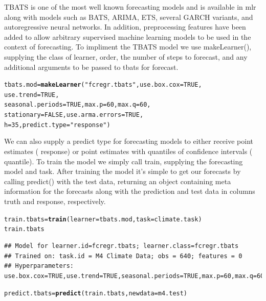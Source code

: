 \documentclass{article}\usepackage[]{graphicx}\usepackage[]{color}
\makeatletter
\newcommand{\hlnum}[1]{\textcolor[rgb]{0.686,0.059,0.569}{#1}}%
\newcommand{\hlstr}[1]{\textcolor[rgb]{0.192,0.494,0.8}{#1}}%
\newcommand{\hlstd}[1]{\textcolor[rgb]{0.345,0.345,0.345}{#1}}%
\newcommand{\hlkwb}[1]{\textcolor[rgb]{0.69,0.353,0.396}{#1}}%
\newcommand{\hlkwc}[1]{\textcolor[rgb]{0.333,0.667,0.333}{#1}}%
\newcommand{\hlkwd}[1]{\textcolor[rgb]{0.737,0.353,0.396}{\textbf{#1}}}%
\newenvironment{kframe}{%
 \def\at@end@of@kframe{}%
 \ifinner\ifhmode%
  \def\at@end@of@kframe{\end{minipage}}%
  \begin{minipage}{\columnwidth}%
 \fi\fi%
 \def\FrameCommand##1{\hskip\@totalleftmargin \hskip-\fboxsep
 \colorbox{shadecolor}{##1}\hskip-\fboxsep
     \hskip-\linewidth \hskip-\@totalleftmargin \hskip\columnwidth}%
 \MakeFramed {\advance\hsize-\width
   \@totalleftmargin\z@ \linewidth\hsize
   \@setminipage}}%
 {\par\unskip\endMakeFramed%
 \at@end@of@kframe}
\newenvironment{knitrout}{}{} %
\theoremstyle{definition}
\newcommand\code{\@codex}
\def\@codex#1{{\normalfont\ttfamily\hyphenchar\font=-1 #1}}
\newcommand{\pkg}[1]{{\fontseries{b}\selectfont #1}}
\makeatother
\begin{document}
TBATS is one of the most well known forecasting models and is available in mlr along with models such as BATS, ARIMA, ETS, several GARCH variants, and autoregressive neural networks. In addition, preprocessing features have been added to allow arbitrary supervised machine learning models to be used in the context of forecasting. To impliment the TBATS model we use  \code{makeLearner()}, supplying the class of learner, order, the number of steps to forecast, and any additional arguments to be passed to \code{tbats} for \pkg{forecast}. 

\begin{knitrout}
\color{fgcolor}\begin{kframe}
\begin{alltt}
\hlstd{tbats.mod} \hlkwb{=}\hlkwd{makeLearner}\hlstd{(}\hlstr{"fcregr.tbats"}\hlstd{,} \hlkwc{use.box.cox} \hlstd{=} \hlnum{TRUE}\hlstd{,}
                      \hlkwc{use.trend} \hlstd{=} \hlnum{TRUE}\hlstd{,}
                      \hlkwc{seasonal.periods} \hlstd{=} \hlnum{TRUE}\hlstd{,} \hlkwc{max.p} \hlstd{=} \hlnum{60}\hlstd{,} \hlkwc{max.q} \hlstd{=} \hlnum{60}\hlstd{,}
                      \hlkwc{stationary} \hlstd{=} \hlnum{FALSE}\hlstd{,} \hlkwc{use.arma.errors} \hlstd{=} \hlnum{TRUE}\hlstd{,}
                      \hlkwc{h} \hlstd{=} \hlnum{35}\hlstd{,} \hlkwc{predict.type} \hlstd{=} \hlstr{"response"}\hlstd{)}
\end{alltt}
\end{kframe}
\end{knitrout}

We can also supply a predict type for forecasting models to either receive point estimates (\code{response}) or point estimates with quantiles of confidence intervals (\code{quantile}). To train the model we simply call train, supplying the forecasting model and task. After training the model it's simple to get our forecasts by calling \code{predict()} with the test data, returning an object containing meta information for the forecasts along with the prediction and test data in columns \code{truth} and \code{response}, respectively.

\begin{knitrout}
\color{fgcolor}\begin{kframe}
\begin{alltt}
\hlstd{train.tbats}\hlkwb{=} \hlkwd{train}\hlstd{(}\hlkwc{learner} \hlstd{= tbats.mod,} \hlkwc{task} \hlstd{= climate.task )}
\hlstd{train.tbats}
\end{alltt}
\begin{verbatim}
## Model for learner.id=fcregr.tbats; learner.class=fcregr.tbats
## Trained on: task.id = M4 Climate Data; obs = 640; features = 0
## Hyperparameters: use.box.cox=TRUE,use.trend=TRUE,seasonal.periods=TRUE,max.p=60,max.q=60,stationary=FALSE,use.arma.errors=TRUE,h=35
\end{verbatim}
\begin{alltt}
\hlstd{predict.tbats} \hlkwb{=} \hlkwd{predict}\hlstd{(train.tbats,} \hlkwc{newdata} \hlstd{= m4.test)}
\end{alltt}
\end{kframe}
\end{knitrout}
\end{document}
